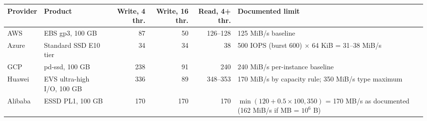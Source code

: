 \begin{tabular}{lp{2.6cm}rrrp{4.2cm}}
\toprule
Provider & Product & Write, 4 thr. & Write, 16 thr. & Read, 4+ thr. & Documented limit \\
\midrule
AWS & EBS gp3, 100 GB & 87 & 50 & 126--128 & 125 MiB/s baseline \\
Azure & Standard SSD E10 tier & 34 & 34 & 38 & 500 IOPS (burst 600) $\times$ 64 KiB = 31--38 MiB/s \\
GCP & pd-ssd, 100 GB & 238 & 91 & 240 & 240 MiB/s per-instance baseline \\
Huawei & EVS ultra-high I/O, 100 GB & 336 & 89 & 348--353 & 170 MiB/s by capacity rule; 350 MiB/s type maximum \\
Alibaba & ESSD PL1, 100 GB & 170 & 170 & 170 & $\min(120+0.5\times100,350)$ = 170 MB/s as documented (162 MiB/s if MB = $10^6$ B) \\
\bottomrule
\end{tabular}
